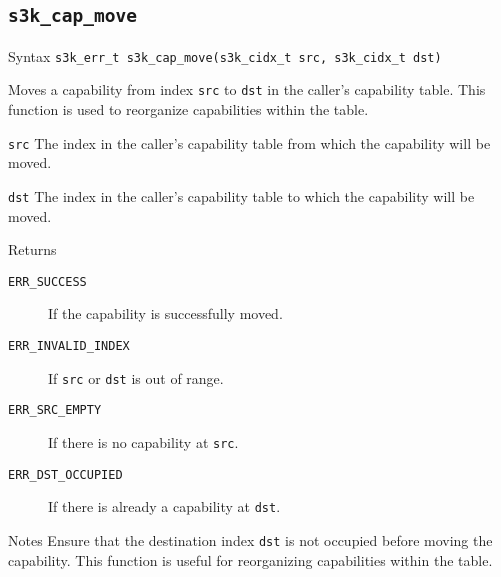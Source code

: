 \documentclass[a4paper,11pt]{article}
\newcommand{\syscall}[1]{\texttt{#1}}
\newenvironment{syscalldoc}[1]{
  \subsection{\syscall{#1}} %
  \begin{tcolorbox}
  \begin{description}[leftmargin=!,style=nextline,noitemsep]
}{
  \end{description}
  \end{tcolorbox}
}
\begin{document}
\begin{syscalldoc}{s3k\_cap\_move}
  \item[Syntax] \lstinline{s3k_err_t s3k_cap_move(s3k_cidx_t src, s3k_cidx_t dst)}

  \item[Description] Moves a capability from index \verb|src| to \verb|dst| in the caller's capability table. This function is used to reorganize capabilities within the table.

  \item[Parameters]
    \begin{description}
      \item[]
      \item[\texttt{src}] The index in the caller's capability table from which the capability will be moved.
      \item[\texttt{dst}] The index in the caller's capability table to which the capability will be moved.
    \end{description}

  \item[Returns]
    \begin{description}
      \item[]
      \item[\texttt{ERR\_SUCCESS}] If the capability is successfully moved.
      \item[\texttt{ERR\_INVALID\_INDEX}] If \verb|src| or \verb|dst| is out of range.
      \item[\texttt{ERR\_SRC\_EMPTY}] If there is no capability at \verb|src|.
      \item[\texttt{ERR\_DST\_OCCUPIED}] If there is already a capability at \verb|dst|.
    \end{description}

  \item[Notes] Ensure that the destination index \verb|dst| is not occupied before moving the capability. This function is useful for reorganizing capabilities within the table.
\end{syscalldoc}
\end{document}
